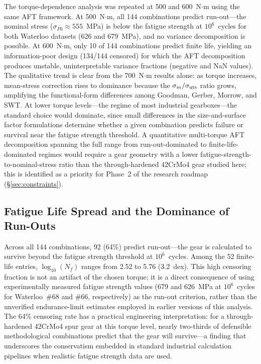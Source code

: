\documentclass[12pt,a4paper]{article}
\begin{document}
The torque-dependence analysis was repeated at 500 and 600~N$\cdot$m
using the same AFT framework. At 500~N$\cdot$m, all 144 combinations
predict run-out---the nominal stress ($\sigma_{F0} \approx 555$~MPa)
is below the fatigue strength at $10^6$~cycles for both Waterloo
datasets (626 and 679~MPa), and no variance decomposition is possible.
At 600~N$\cdot$m, only 10 of 144 combinations predict finite life,
yielding an information-poor design (134/144 censored) for which the
AFT decomposition produces unstable, uninterpretable variance fractions
(negative and NaN values). The qualitative trend is clear from the
700~N$\cdot$m results alone: as torque increases, mean-stress
correction rises to dominance because the $\sigma_m/\sigma_{\rm uts}$
ratio grows, amplifying the functional-form differences among Goodman,
Gerber, Morrow, and SWT. At lower torque levels---the regime of most
industrial gearboxes---the standard choice would dominate, since small
differences in the size-and-surface factor formulations determine
whether a given combination predicts failure or survival near the
fatigue strength threshold. A quantitative multi-torque AFT
decomposition spanning the full range from run-out-dominated to
finite-life-dominated regimes would require a gear geometry with a
lower fatigue-strength-to-nominal-stress ratio than the
through-hardened 42CrMo4 gear studied here; this is identified as a
priority for Phase~2 of the research roadmap
(\S\ref{sec:constraints}).

\subsection{Fatigue Life Spread and the Dominance of Run-Outs}

Across all 144 combinations, 92 (64\%) predict run-out---the gear is
calculated to survive beyond the fatigue strength threshold at
$10^6$~cycles. Among the 52 finite-life entries, $\log_{10}(N_f)$
ranges from 2.52 to 5.76 (3.2~dex). This high censoring fraction is
not an artifact of the chosen torque; it is a direct consequence of
using experimentally measured fatigue strength values (679 and
626~MPa at $10^6$~cycles for Waterloo~\#68 and \#66, respectively)
as the run-out criterion, rather than the unverified endurance-limit
estimates employed in earlier versions of this analysis. The 64\%
censoring rate has a practical engineering interpretation: for a
through-hardened 42CrMo4 spur gear at this torque level, nearly
two-thirds of defensible methodological combinations predict that the
gear will survive---a finding that underscores the conservatism
embedded in standard industrial calculation pipelines when realistic
fatigue strength data are used.
\end{document}
